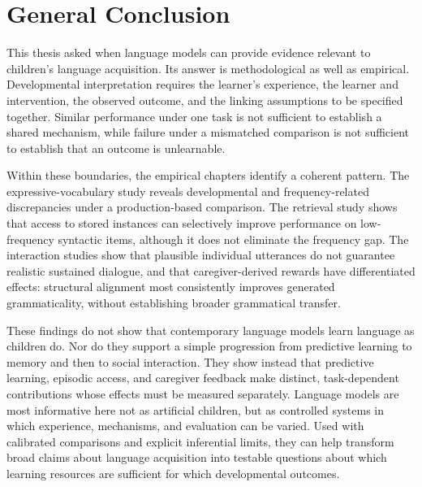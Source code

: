\section{General Conclusion}
\label{sec:gd_conclusion}

This thesis asked when language models can provide evidence relevant to children's language acquisition. Its answer is methodological as well as empirical. Developmental interpretation requires the learner's experience, the learner and intervention, the observed outcome, and the linking assumptions to be specified together. Similar performance under one task is not sufficient to establish a shared mechanism, while failure under a mismatched comparison is not sufficient to establish that an outcome is unlearnable.

Within these boundaries, the empirical chapters identify a coherent pattern. The expressive-vocabulary study reveals developmental and frequency-related discrepancies under a production-based comparison. The retrieval study shows that access to stored instances can selectively improve performance on low-frequency syntactic items, although it does not eliminate the frequency gap. The interaction studies show that plausible individual utterances do not guarantee realistic sustained dialogue, and that caregiver-derived rewards have differentiated effects: structural alignment most consistently improves generated grammaticality, without establishing broader grammatical transfer.

These findings do not show that contemporary language models learn language as children do. Nor do they support a simple progression from predictive learning to memory and then to social interaction. They show instead that predictive learning, episodic access, and caregiver feedback make distinct, task-dependent contributions whose effects must be measured separately. Language models are most informative here not as artificial children, but as controlled systems in which experience, mechanisms, and evaluation can be varied. Used with calibrated comparisons and explicit inferential limits, they can help transform broad claims about language acquisition into testable questions about which learning resources are sufficient for which developmental outcomes.
